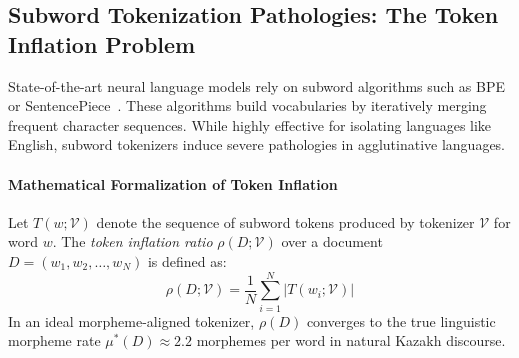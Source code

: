 \subsection{Subword Tokenization Pathologies: The Token Inflation Problem}
State-of-the-art neural language models rely on subword algorithms such as BPE~\citep{sennrich2016subword} or SentencePiece~\citep{kudo2018sentencepiece}. These algorithms build vocabularies by iteratively merging frequent character sequences. While highly effective for isolating languages like English, subword tokenizers induce severe pathologies in agglutinative languages.

\paragraph{Mathematical Formalization of Token Inflation}
Let $T(w; \mathcal{V})$ denote the sequence of subword tokens produced by tokenizer $\mathcal{V}$ for word $w$. The \textit{token inflation ratio} $\rho(D; \mathcal{V})$ over a document $D = (w_1, w_2, \dots, w_N)$ is defined as:
\begin{equation}
\label{eq:token_inflation}
\rho(D; \mathcal{V}) = \frac{1}{N} \sum_{i=1}^N |T(w_i; \mathcal{V})|
\end{equation}
In an ideal morpheme-aligned tokenizer, $\rho(D)$ converges to the true linguistic morpheme rate $\mu^*(D) \approx 2.2$ morphemes per word in natural Kazakh discourse. 

